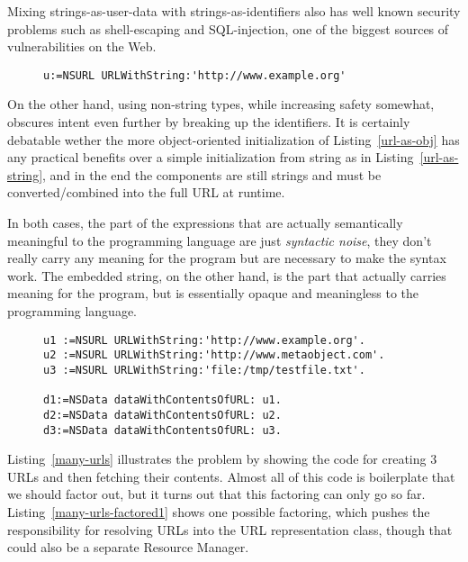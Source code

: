 \documentclass[preprint,authoryear]{acm_proc_article-sp}
\begin{document}
Mixing strings-as-user-data with strings-as-identifiers also has well known
security problems such as shell-escaping and SQL-injection, one of the
biggest sources of vulnerabilities on the Web.

\begin{figure}[htbp]
\begin{lstlisting}[style=L,label=url-as-string,caption=URL initialized with a single string.]
u:=NSURL URLWithString:'http://www.example.org'
\end{lstlisting}
\end{figure}



On the other hand, using non-string types, while increasing safety somewhat,
obscures intent even further by breaking up the identifiers.
It is certainly debatable wether the more object-oriented
initialization of Listing~\ref{url-as-obj}  has any practical benefits over a
simple initialization from string as in Listing~\ref{url-as-string}, and in
the end the components are still strings and must be converted/combined
into the full URL at runtime.



In both cases, the part of the expressions that are actually semantically meaningful
to the programming language are just {\em syntactic noise}, they don't really carry
any meaning for the program but are necessary to make the syntax work.  The
embedded string, on the other hand, is the part that actually carries meaning for
the program, but is essentially opaque and meaningless to the programming
language.

\begin{figure}[htbp]
\begin{lstlisting}[style=L,label=many-urls,caption=Many URLs with duplication]
u1 :=NSURL URLWithString:'http://www.example.org'.
u2 :=NSURL URLWithString:'http://www.metaobject.com'.
u3 :=NSURL URLWithString:'file:/tmp/testfile.txt'.

d1:=NSData dataWithContentsOfURL: u1.
d2:=NSData dataWithContentsOfURL: u2.
d3:=NSData dataWithContentsOfURL: u3.
\end{lstlisting}
\end{figure}

Listing~\ref{many-urls} illustrates the problem by showing the code for
creating 3 URLs and then fetching their contents.  Almost all of this code
is boilerplate that we should factor out, but it turns out that this factoring
can only go so far.  Listing~\ref{many-urls-factored1} shows one possible
factoring, which pushes the responsibility for resolving URLs into the
URL representation class, though that could also be a separate Resource 
Manager. 
\end{document}
